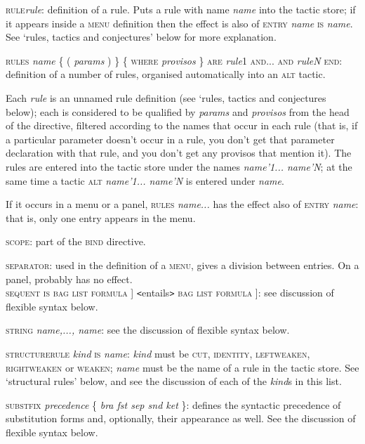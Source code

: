 \textsc{rule{\nobreakspace}}\textit{rule}: definition of a rule. Puts a rule with name \textit{name} into the tactic store; if it appears inside a \textsc{menu} definition then the effect is also of \textsc{entry} \textit{name} \textsc{is} \textit{name}. See `rules, tactics and conjectures' below for more explanation.


\textsc{rules} \textit{name} \{ ( \textit{params} ) \} \{ \textsc{where} \textit{provisos} \} \textsc{are} \textit{rule}1 \textsc{and... and} \textit{ruleN} \textsc{end}: definition of a number of rules, organised automatically into an \textsc{alt} tactic.


\tab Each \textit{rule} is an unnamed rule definition (see `rules, tactics and conjectures below); each is considered to be qualified by \textit{params} and \textit{provisos} from the head of the directive, filtered according to the names that occur in each rule (that is, if a particular parameter doesn't occur in a rule, you don't get that parameter declaration with that rule, and you don't get any provisos that mention it). The rules are entered into the tactic store under the names \textit{name'1... name'N}; at the same time a tactic \textsc{alt} \textit{name'1... name'N} is entered under \textit{name}.


\tab If it occurs in a menu or a panel, \textsc{rules} \textit{name...} has the effect also of \textsc{entry} \textit{name}: that is, only one entry appears in the menu.


\textsc{scope}: part of the \textsc{bind} directive.


\textsc{separator}: used in the definition of a \textsc{menu}, gives a division between entries. On a panel, probably has no effect.\\
\textsc{sequent is}  \textsc{bag} {\textbar} \textsc{list} {\textbar} \textsc{formula} ] \texttt{<}entails\texttt{>} \textsc{bag} {\textbar} \textsc{list} {\textbar} \textsc{formula} ]: see discussion of flexible syntax below.


\textsc{string} \textit{name,..., name}: see the discussion of flexible syntax below.


\textsc{structurerule} \textit{kind} \textsc{is} \textit{name}: \textit{kind} must be \textsc{cut}, \textsc{identity}, \textsc{leftweaken, rightweaken} or \textsc{weaken}; \textit{name} must be the name of a rule in the tactic store. See `structural rules' below, and see the discussion of each of the \textit{kind}s in this list.


\textsc{substfix} \textit{precedence} \{ \textit{bra fst sep snd ket} \}: defines the syntactic precedence of substitution forms and, optionally, their appearance as well. See the discussion of flexible syntax below.


